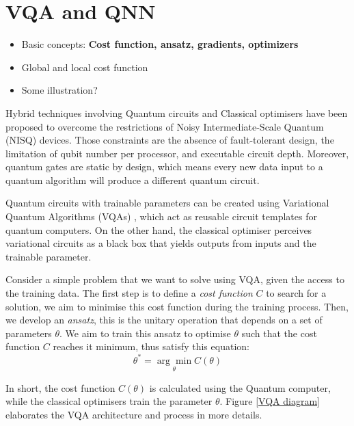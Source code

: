 \section{VQA and QNN}
\begin{itemize}
    \item Basic concepts: \textbf{Cost function, ansatz, gradients, optimizers}
    \item Global and local cost function
    \item Some illustration?
\end{itemize}

Hybrid techniques involving Quantum circuits and Classical optimisers have been proposed to overcome the restrictions of Noisy Intermediate-Scale Quantum (NISQ) \cite{brooksQuantumSupremacyHunt2019} devices. 
Those constraints are the absence of fault-tolerant design, the limitation of qubit number per processor, and executable circuit depth. 
Moreover, quantum gates are static by design, which means every new data input to a quantum algorithm will produce a different quantum circuit.

Quantum circuits with trainable parameters can be created using Variational Quantum Algorithms (VQAs) \cite{cerezo2021variational}, which act as reusable circuit templates for quantum computers.
On the other hand, the classical optimiser perceives variational circuits as a black box that yields outputs from inputs and the trainable parameter.

Consider a simple problem that we want to solve using VQA, given the access to the training data.
The first step is to define a \textit{cost function} $C$ to search for a solution, we aim to minimise this cost function during the training process.
Then, we develop an \textit{ansatz}, this is the unitary operation that depends on a set of parameters $\theta$. We aim to train this ansatz to optimise $\theta$ such that the cost function $C$ reaches it minimum, thus satisfy this equation:
\begin{equation}
    \theta^* = \underset{\theta}{\arg \min} C(\theta)
    \label{optimize theta with ansatz}
\end{equation}

In short, the cost function $C(\theta)$ is calculated using the Quantum computer, while the classical optimisers train the parameter $\theta$. Figure \ref{VQA diagram} elaborates the VQA architecture and process in more details.

